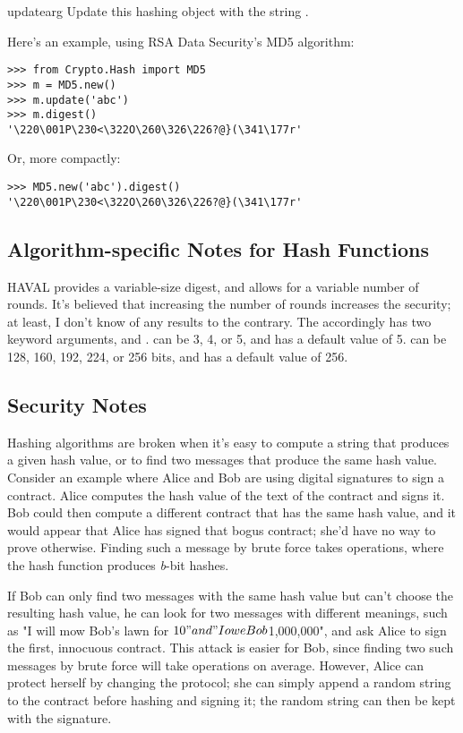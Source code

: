 \documentclass{howto}
\begin{document}
\begin{funcdesc}{update}{arg}
Update this hashing object with the string .
\end{funcdesc}

Here's an example, using RSA Data Security's MD5 algorithm:

\begin{verbatim}
>>> from Crypto.Hash import MD5
>>> m = MD5.new()
>>> m.update('abc')
>>> m.digest()
'\220\001P\230<\322O\260\326\226?@}(\341\177r'
\end{verbatim}


Or, more compactly:
\begin{verbatim}
>>> MD5.new('abc').digest()
'\220\001P\230<\322O\260\326\226?@}(\341\177r'
\end{verbatim}

\subsection{Algorithm-specific Notes for Hash Functions}

HAVAL provides a variable-size digest, and allows for a variable number
of rounds.  It's believed that increasing the number of rounds increases
the security; at least, I don't know of any results to the contrary.
The  accordingly has two keyword arguments,
 and .   can be 3, 4, or 5,
and has a default value of 5.   can be 128, 160, 192,
224, or 256 bits, and has a default value of 256. 

\subsection{Security Notes}
Hashing algorithms are broken when it's easy to compute a
string that produces a given hash value, or to find two
messages that produce the same hash value. Consider an example where
Alice and Bob are using digital signatures to sign a contract.  Alice
computes the hash value of the text of the contract and signs it.  Bob
could then compute a different contract that has the same hash value,
and it would appear that Alice has signed that bogus contract; she'd
have no way to prove otherwise.  Finding such a message by brute force
takes  operations, where the hash function produces
\emph{b}-bit hashes.

If Bob can only find two messages with the same hash value but can't
choose the resulting hash value, he can look for two messages with
different meanings, such as "I will mow Bob's lawn for $10" and "I owe
Bob $1,000,000", and ask Alice to sign the first, innocuous contract.
This attack is easier for Bob, since finding two such messages by brute
force will take  operations on average.  However,
Alice can protect herself by changing the protocol; she can simply
append a random string to the contract before hashing and signing it;
the random string can then be kept with the signature.
\end{document}
